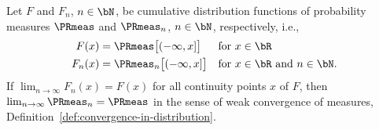\begin{theorem}
  \label{thm:convergence-in-distribution-with-cdf}
  \leanok
  Let $F$ and $F_n$, $n \in \bN$, be cumulative distribution functions of
  probability measures $\PRmeas$ and $\PRmeas_n$, $n \in \bN$, respectively, i.e.,
  \begin{align*}
      F(x) = \; & \PRmeas \big[(-\infty,x]\big] & & \text{for $x \in \bR$} \\
      F_n(x) = \; & \PRmeas_n \big[(-\infty,x]\big] & & \text{for $x \in \bR$ and $n \in \bN$.}
  \end{align*}
  If $\lim_{n \to \infty} F_n(x) = F(x)$ for all continuity points $x$ of $F$,
  then $\lim_{n \to \infty} \PRmeas_n = \PRmeas$ in the sense of weak convergence
  of measures, Definition~\ref{def:convergence-in-distribution}.
\end{theorem}
